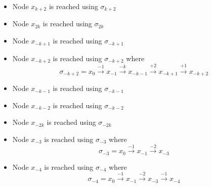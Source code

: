 \begin{itemize}
\begin{itemize}
\item Node $x_{k+2}$ is reached using $\sigma_{k+2}$ 

\item Node $x_{2k}$ is reached using $\sigma_{2k}$ 

\item Node $x_{-k+1}$ is reached using $\sigma_{-k+1}$  

\item Node $x_{-k+2}$ is reached using $\sigma_{-k+2}$   where 
$$\sigma_{-k+2} = x_{0} \xrightarrow {-1} x_{-1} \xrightarrow {-k} x_{-k-1} \xrightarrow {+2} x_{-k+1} \xrightarrow {+1} x_{-k+2}$$ 

\item Node $x_{-k-1}$ is reached using $\sigma_{-k-1}$  

\item Node $x_{-k-2}$ is reached using $\sigma_{-k-2}$  

\item Node $x_{-2k}$ is reached using $\sigma_{-2k}$  

\item Node $x_{-3}$ is reached using $\sigma_{-3}$ where
 $$\sigma_{-3} = x_{0} \xrightarrow {-1} x_{-1} \xrightarrow {-2} x_{-3} $$

\item Node $x_{-4}$ is reached using $\sigma_{-4}$ where
 $$\sigma_{-4} = x_{0} \xrightarrow {-1} x_{-1} \xrightarrow {-2} x_{-3}\xrightarrow {-1} x_{-4} $$



\end{itemize}

\end{itemize}

